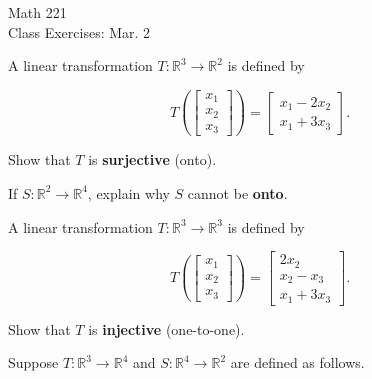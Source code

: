 \documentclass[11pt]{article}
\begin{document}
\begin{center}
\Large
\rm{Math 221}
\\
\rm{Class Exercises:  Mar. 2}
\\
\end{center}
\vspace{0.2in}

A linear transformation $T:\mathbb{R}^3\to\mathbb{R}^2$ is defined by 

\begin{displaymath}
T\left(\left[ \begin{array}{r} x_1 \\ x_2 \\ x_3 \end{array}\right]\right) =  \left[ \begin{array}{r} x_1-2x_2 \\ x_1+3x_3 \end{array}\right].
\end{displaymath}

Show that $T$ is \textbf{surjective} (onto).


\vspace{4in}


If $S:\mathbb{R}^2\to\mathbb{R}^4$, explain why $S$ cannot be \textbf{onto}.

\pagebreak

A linear transformation $T:\mathbb{R}^3\to\mathbb{R}^3$ is defined by 

\begin{displaymath}
T\left(\left[ \begin{array}{r} x_1 \\ x_2 \\ x_3 \end{array}\right]\right) =  \left[ \begin{array}{c} 2x_2 \\ x_2 - x_3 \\ x_1+3x_3 \end{array}\right].
\end{displaymath}

Show that $T$ is \textbf{injective} (one-to-one).

\pagebreak

Suppose $T:\mathbb{R}^3\to\mathbb{R}^4$ and $S:\mathbb{R}^4\to\mathbb{R}^2$ are defined as follows.
\end{document}
